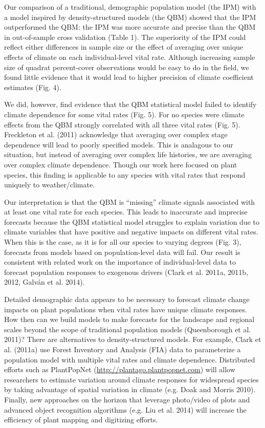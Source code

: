 \documentclass[12pt,]{article}
\begin{document}
Our comparison of a traditional, demographic population model (the IPM)
with a model inspired by density-structured models (the QBM) showed that
the IPM outperformed the QBM: the IPM was more accurate and precise than
the QBM in out-of-sample cross validation (Table 1). The superiority of
the IPM could reflect either differences in sample size or the effect of
averaging over unique effects of climate on each individual-level vital
rate. Although increasing sample size of quadrat percent-cover
observations would be easy to do in the field, we found little evidence
that it would lead to higher precision of climate coefficient estimates
(Fig. 4).

We did, however, find evidence that the QBM statistical model failed to
identify climate dependence for some vital rates (Fig. 5). For no
species were climate effects from the QBM strongly correlated with all
three vital rates (Fig. 5). Freckleton et al. (2011) acknowledge that
averaging over complex stage dependence will lead to poorly specified
models. This is analagous to our situation, but instead of averaging
over complex life histories, we are averaging over complex climate
dependence. Though our work here focused on plant species, this finding
is applicable to any species with vital rates that respond uniquely to
weather/climate.

Our interpretation is that the QBM is ``missing'' climate signals
associated with at least one vital rate for each species. This leads to
inaccurate and imprecise forecasts because the QBM statistical model
struggles to explain variation due to climate variables that have
positive and negative impacts on different vital rates. When this is the
case, as it is for all our species to varying degrees (Fig. 3),
forecasts from models based on population-level data will fail. Our
result is consistent with related work on the importance of
individual-level data to forecast population responses to exogenous
drivers (Clark et al. 2011a, 2011b, 2012, Galván et al. 2014).

Detailed demographic data appears to be necessary to forecast climate
change impacts on plant populations when vital rates have unique climate
responses. How then can we build models to make forecasts for the
landscape and regional scales beyond the scope of traditional population
models (Queenborough et al. 2011)? There are alternatives to
density-structured models. For example, Clark et al. (2011a) use Forest
Inventory and Analysis (FIA) data to parameterize a population model
with multiple vital rates and climate dependence. Distributed efforts
such as PlantPopNet (\url{http://plantago.plantpopnet.com}) will allow
researchers to estimate variation around climate responses for
widespread species by taking advantage of spatial variation in climate
(e.g. Doak and Morris 2010). Finally, new approaches on the horizon that
leverage photo/video of plots and advanced object recognition algorithms
(e.g. Liu et al. 2014) will increase the efficiency of plant mapping and
digitizing efforts.
\end{document}
